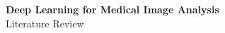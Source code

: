 \documentclass{article}
\begin{document}
  
  
\begin{center}
    {\Large {\bf Deep Learning for Medical Image Analysis}} \\
    \vspace{0.3cm}
    {\Large Literature Review} \\
    
    \vspace{1cm}
\end{center}

 



\clearpage



	
\end{document}
